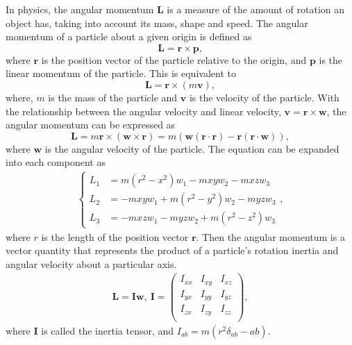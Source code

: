 In physics, the angular momentum $\mathbf{L}$ is a measure of the amount of 
rotation an object has, taking into account its mass, shape and speed. 
The angular momentum of a particle about a given origin is defined as
\begin{equation}
\mathbf{L} = \mathbf{r} \times \mathbf{p},
\end{equation}
where $\mathbf{r}$ is the position vector of the particle relative to the 
origin, and $\mathbf{p}$ is the linear momentum of the particle. 
This is equivalent to
\begin{equation}
\mathbf{L} = \mathbf{r} \times (m\mathbf{v}),
\end{equation}
where, $m$ is the mass of the particle and $\mathbf{v}$ is the velocity of 
the particle. 
With the relationship between the angular velocity and linear velocity, 
$\mathbf{v} = \mathbf{r} \times \mathbf{w}$, the angular momentum can be 
expressed as
\begin{equation}
\mathbf{L} = m\mathbf{r} \times (\mathbf{w} \times \mathbf{r}) = m (\mathbf{w} (\mathbf{r} \cdot \mathbf{r}) - \mathbf{r} (\mathbf{r} \cdot \mathbf{w})), 
\label{eqn:angular_momentum1}
\end{equation}
where $\mathbf{w}$ is the angular velocity of the particle. 
The equation  can be expanded into each 
component as
\begin{eqnarray}
\left\{
\begin{aligned}
L_1 &= m(r^2-x^2)w_1 - mxyw_2 - mxzw_3 \\
L_2 &= -mxyw_1 + m(r^2-y^2)w_2 - myzw_3 \\
L_3 &= -mxzw_1 - myzw_2 + m(r^2-z^2)w_3
\end{aligned}
\right.,
\end{eqnarray}
where $r$ is the length of the position vector $\mathbf{r}$.
Then the angular momentum is a vector quantity that represents the product 
of a particle's rotation inertia and angular velocity about a particular 
axis.
\begin{eqnarray}
\mathbf{L} = \mathbf{I}\mathbf{w},\ 
\mathbf{I} = \left(
	     \begin{array}{ccc}
	     I_{xx} & I_{xy} & I_{xz} \\
	     I_{yx} & I_{yy} & I_{yz} \\
	     I_{zx} & I_{zy} & I_{zz} \\
	     \end{array}
	     \right), 
\label{eqn:angular_momentum2}
\end{eqnarray}
where $\mathbf{I}$ is called the inertia tensor, and 
$I_{ab} = m(r^2\delta_{ab}-ab)$.

